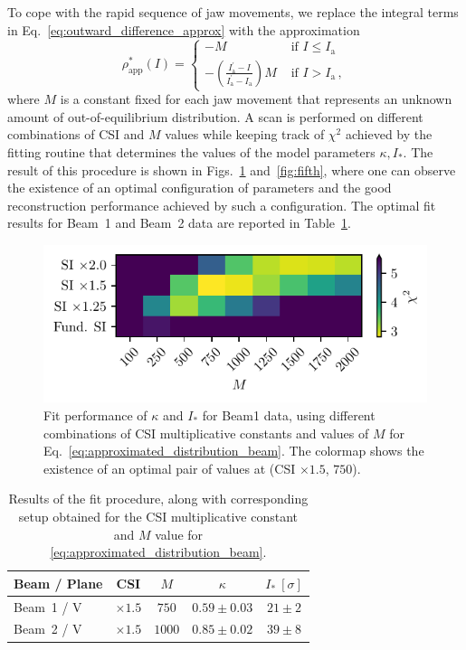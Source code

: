 To cope with the rapid sequence of jaw movements, we replace the integral terms in Eq.~\eqref{eq:outward_difference_approx} with the approximation
\begin{equation}
    \rho_{\mathrm{app}}^{*}(I)= \begin{cases} -M & \text { if } I\leq I_{\mathrm{a}}\\ -\left(\frac{I_{\mathrm{a}}^{\prime }-I}{I_{\mathrm{a}}^{ \prime}-I_{\mathrm{a}}}\right) M & \text { if } I>I_{\mathrm{a}} \, , \end{cases} 
    \label{eq:approximated_distribution_beam}
\end{equation}
where $M$ is a constant fixed for each jaw movement that represents an unknown amount of out-of-equilibrium distribution.
A scan is performed on different combinations of CSI and $M$ values while keeping track of $\chi^2$ achieved by the fitting routine that determines the values of the model parameters $\kappa, I_\ast$. The result of this procedure is shown in Figs.~\ref{fig:fourth} and~\ref{fig:fifth}, where one can observe the existence of an optimal configuration of parameters and the good reconstruction performance achieved by such a configuration. The optimal fit results for Beam~1 and Beam~2 data are reported in Table~\ref{tab:fit_results}.

\begin{figure}
    \centering
    \includegraphics[trim={0 2.5mm 0 1.5mm}, clip, width=0.98\columnwidth]{5_Diffusion_measurement_LHC/figs/fourth.pdf}
    \caption{Fit performance of $\kappa$ and $I_\ast$ for Beam1 data, using different combinations of CSI multiplicative constants and values of $M$ for Eq.~\eqref{eq:approximated_distribution_beam}. The colormap shows the existence of an optimal pair of values at (CSI $\times 1.5$, $750$).}
    \label{fig:fourth}
\end{figure}
%
\begin{table}[htb]
    \centering
    \caption{Results of the fit procedure, along with corresponding setup obtained for the CSI multiplicative constant and $M$ value for \eqref{eq:approximated_distribution_beam}.}
    \begin{tabular}{lcccc}
        \toprule
        Beam / Plane & CSI & $M$ & $\kappa$ & $I_\ast\ [\sigma]$ \\
        \midrule
        Beam~1 / V & $\times1.5$ & $750$ & $0.59\pm0.03$ & $21\pm2$ \\
        Beam~2 / V & $\times1.5$ & $1000$ & $0.85\pm0.02$ & $39\pm8$ \\
        \bottomrule
    \end{tabular}
    \label{tab:fit_results}
\end{table}
%

